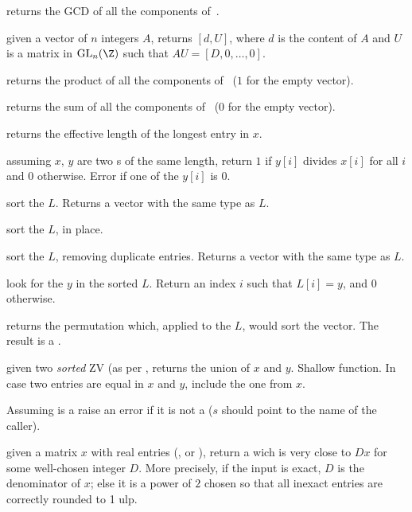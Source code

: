  returns the GCD of all the components
of~.

 given a vector of $n$ integers $A$, returns $[d,
U]$, where $d$ is the content of $A$ and $U$ is a matrix
in $\text{GL}_n(\Z)$ such that $AU = [D,0, \dots,0]$.

 returns the product of all the components
of~ ($1$ for the empty vector).

 returns the sum of all the components
of~ ($0$ for the empty vector).

 returns the effective length of the longest
entry in $x$.

 assuming $x$, $y$ are two s of the same
length, return $1$ if $y[i]$ divides $x[i]$ for all $i$ and $0$ otherwise.
Error if one of the $y[i]$ is $0$.

 sort the  $L$.
Returns a vector with the same type as $L$.

 sort the  $L$, in place.

 sort the  $L$, removing duplicate
entries. Returns a vector with the same type as $L$.

 look for the  $y$ in the sorted
 $L$. Return an index $i$ such that $L[i] = y$, and  $0$ otherwise.

 returns the permutation which, applied to the
 $L$, would sort the vector. The result is a .

 given two \emph{sorted} ZV (as per
, returns the union of $x$ and $y$. Shallow function. In case two
entries are equal in $x$ and $y$,  include the one from $x$.


 Assuming  is a 
raise an error if it is not a  ($s$ should point to the name of the
caller).

 given a matrix $x$ with real entries
(,  or ), return a  wich is very close
to $D x$ for some well-chosen integer $D$. More precisely, if the input is
exact, $D$ is the denominator of $x$; else it is a power of $2$ chosen
so that all inexact entries are correctly rounded to 1 ulp.

